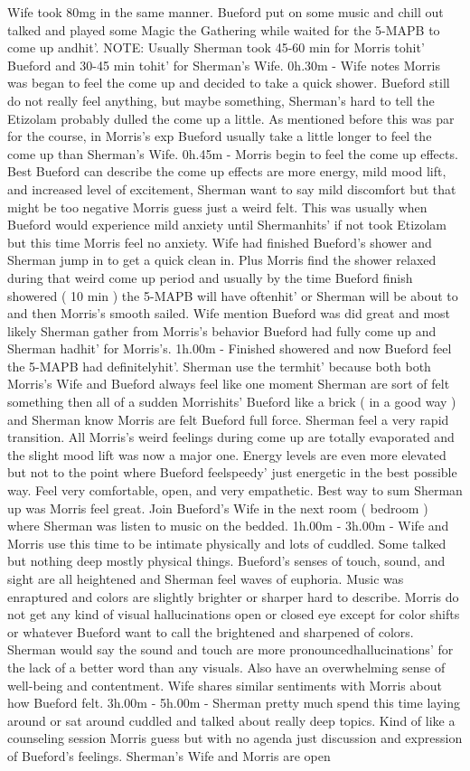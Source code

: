 \documentclass[12pt]{book}
\begin{document}
Wife took 80mg in the same manner. Bueford put on some music and chill out talked and played some Magic the Gathering while waited for the 5-MAPB to come up andhit'. NOTE: Usually Sherman took 45-60 min for Morris tohit' Bueford and 30-45 min tohit' for Sherman's Wife. 0h.30m - Wife notes Morris was began to feel the come up and decided to take a quick shower. Bueford still do not really feel anything, but maybe something, Sherman's hard to tell the Etizolam probably dulled the come up a little. As mentioned before this was par for the course, in Morris's exp Bueford usually take a little longer to feel the come up than Sherman's Wife. 0h.45m - Morris begin to feel the come up effects. Best Bueford can describe the come up effects are more energy, mild mood lift, and increased level of excitement, Sherman want to say mild discomfort but that might be too negative Morris guess just a weird felt. This was usually when Bueford would experience mild anxiety until Shermanhits' if not took Etizolam but this time Morris feel no anxiety. Wife had finished Bueford's shower and Sherman jump in to get a quick clean in. Plus Morris find the shower relaxed during that weird come up period and usually by the time Bueford finish showered ( 10 min ) the 5-MAPB will have oftenhit' or Sherman will be about to and then Morris's smooth sailed. Wife mention Bueford was did great and most likely Sherman gather from Morris's behavior Bueford had fully come up and Sherman hadhit' for Morris's. 1h.00m - Finished showered and now Bueford feel the 5-MAPB had definitelyhit'. Sherman use the termhit' because both both Morris's Wife and Bueford always feel like one moment Sherman are sort of felt something then all of a sudden Morrishits' Bueford like a brick ( in a good way ) and Sherman know Morris are felt Bueford full force. Sherman feel a very rapid transition. All Morris's weird feelings during come up are totally evaporated and the slight mood lift was now a major one. Energy levels are even more elevated but not to the point where Bueford feelspeedy' just energetic in the best possible way. Feel very comfortable, open, and very empathetic. Best way to sum Sherman up was Morris feel great. Join Bueford's Wife in the next room ( bedroom ) where Sherman was listen to music on the bedded. 1h.00m - 3h.00m - Wife and Morris use this time to be intimate physically and lots of cuddled. Some talked but nothing deep mostly physical things. Bueford's senses of touch, sound, and sight are all heightened and Sherman feel waves of euphoria. Music was enraptured and colors are slightly brighter or sharper hard to describe. Morris do not get any kind of visual hallucinations open or closed eye except for color shifts or whatever Bueford want to call the brightened and sharpened of colors. Sherman would say the sound and touch are more pronouncedhallucinations' for the lack of a better word than any visuals. Also have an overwhelming sense of well-being and contentment. Wife shares similar sentiments with Morris about how Bueford felt. 3h.00m - 5h.00m - Sherman pretty much spend this time laying around or sat around cuddled and talked about really deep topics. Kind of like a counseling session Morris guess but with no agenda just discussion and expression of Bueford's feelings. Sherman's Wife and Morris are open 
\end{document}
